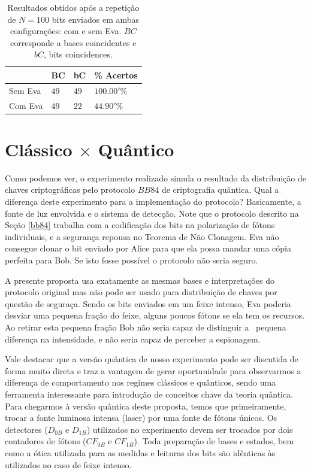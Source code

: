 \documentclass[pra, twocolumn]{revtex4}
\begin{document}
\begin{table} [H]
\centering
\begin{tabular}{|p{2.0cm}|p{2.0cm}|p{2.0cm}|p{2.0cm}|} 
   
   \hline
      & BC& bC & \% Acertos \\
   \hline

   Sem Eva & $49$ &  $49$ & $100.00'\%$  \\ \hline
   Com Eva & $49$ & $22$ & $44.90'\%$  \\ \hline
    
         \end{tabular}
    \caption{Resultados obtidos ap\'os a repeti\c c\~ao de $N=100$ bits enviados em ambas configura\c c\~oes: com e sem Eva. $BC$ corresponde a bases coincidentes e $bC$, bits coincidences.}
              \label{Tabela5}
      \end{table} 	


\section{Cl\'assico $\times$ Qu\^antico}

Como podemos ver, o experimento realizado simula o resultado da distribui\c c\~ao de chaves criptogr\'aficas pelo protocolo $BB84$ de criptografia qu\^antica. Qual a diferen\c ca deste experimento para a implementa\c c\~ao do protocolo? Basicamente, a fonte de luz envolvida e o sistema de detec\c c\~ao. Note que o protocolo descrito na Se\c c\~ao \ref{bb84} trabalha com a codifica\c c\~ao dos bits na polariza\c c\~ao de f\'otons individuais, e a seguran\c ca repousa no Teorema de N\~ao Clonagem\cite{nilsen}. Eva n\~ao consegue clonar o bit enviado por Alice para que ela possa mandar uma c\'opia perfeita para Bob. Se isto fosse poss\'ivel o protocolo n\~ao seria seguro.

A presente proposta usa exatamente as mesmas bases e interpreta\c c\~oes do protocolo original mas n\~ao pode ser usado para distribui\c c\~ao de chaves por quest\~ao de segura\c ca. Sendo os bits enviados em um feixe intenso, Eva poderia desviar uma pequena fra\c c\~ao do feixe, alguns poucos f\'otons se ela tem os recursos. Ao retirar esta pequena fra\c c\~ao Bob n\~ao seria capaz de distinguir a \ pequena diferen\c ca na intensidade, e n\~ao seria capaz de perceber a espionagem. 

Vale destacar que a vers\~ao qu\^antica de nosso experimento pode ser discutida de forma muito direta e traz a vantagem de gerar oportunidade para observarmos a diferen\c ca de comportamento nos regimes cl\'assicos e qu\^anticos, sendo uma ferramenta interessante para introdu\c c\~ao de conceitos chave da teoria qu\^antica. Para chegarmos \`a vers\~ao qu\^antica deste proposta, temos que primeiramente, trocar a fonte luminosa intensa (laser) por uma fonte de f\'otons \'unicos. Os detectores ($D_{0B}$ e $D_{1B}$) utilizados no experimento devem ser trocados por dois contadores de f\'otons
($CF_{0B}$ e $CF_{1B}$). Toda prepara\c c\~ao de bases e estados, bem como a \'otica utilizada para as medidas e leituras dos bits s\~ao id\^enticas \`as utilizados no caso de feixe intenso.
\end{document}
